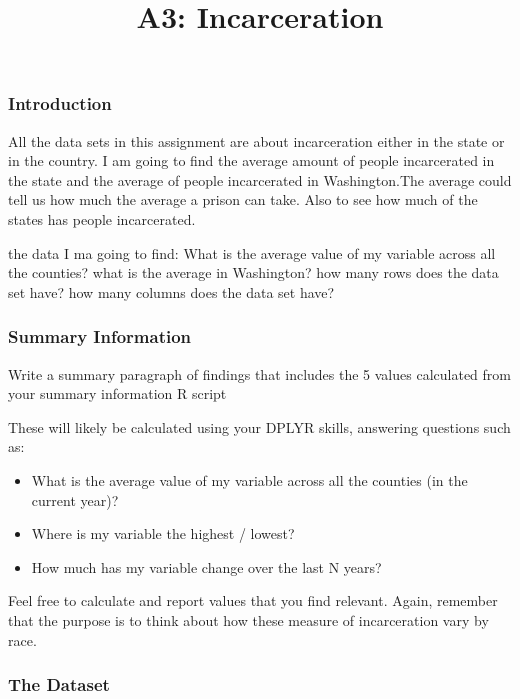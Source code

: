 \documentclass[
]{article}
\title{A3: Incarceration}
\author{}
\date{\vspace{-2.5em}}
\providecommand{\tightlist}{%
  \setlength{\itemsep}{0pt}\setlength{\parskip}{0pt}}
\begin{document}
\maketitle

\subsubsection{Introduction}\label{introduction}

All the data sets in this assignment are about incarceration either in
the state or in the country. I am going to find the average amount of
people incarcerated in the state and the average of people incarcerated
in Washington.The average could tell us how much the average a prison
can take. Also to see how much of the states has people incarcerated.

the data I ma going to find: What is the average value of my variable
across all the counties? what is the average in Washington? how many
rows does the data set have? how many columns does the data set have?

\subsubsection{Summary Information}\label{summary-information}

Write a summary paragraph of findings that includes the 5 values
calculated from your summary information R script

These will likely be calculated using your DPLYR skills, answering
questions such as:~

\begin{itemize}
\tightlist
\item
  What is the average value of my variable across all the counties (in
  the current year)?
\item
  Where is my variable the highest / lowest?
\item
  How much has my variable change over the last N years?
\end{itemize}

Feel free to calculate and report values that you find relevant. Again,
remember that the purpose is to think about how these measure of
incarceration vary by race.

\subsubsection{The Dataset}\label{the-dataset}
\end{document}
